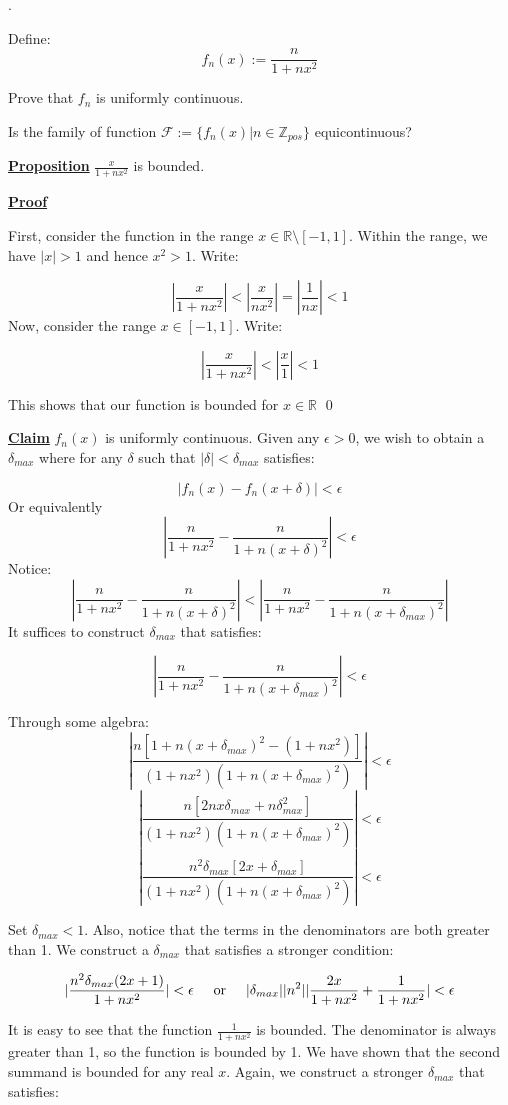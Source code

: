 \documentclass{article}
\newcommand{\new}[1]{
    \vspace{2mm}
    \noindent
    \textbf{
    \underline{#1}}
}
\def\ZZ{{\mathbb{Z}}}
\def\RR{{\mathbb{R}}}
\newcounter{problemcnt}
\newcommand{\Problem}{{
    \vspace{5mm}
    \stepcounter{problemcnt}
    \noindent
    \arabic{problemcnt}. 
}
}
\newcommand{\Proof}{{
    \vspace{2mm}
    \noindent
    \textbf{
    \underline{Proof}}
}
}
\newcommand{\textOr}{
    {
        \hspace{5mm}
        \textrm{or}
        \hspace{5mm}
    }
}
\begin{document}
\Problem
Define:
\[
    f_n(x) := 
    \frac{n}{1+nx^2}
\]

Prove that $f_n$ is uniformly continuous. 

Is the family of function
$\mathcal{F}:=\{f_n(x)|n\in \ZZ_{pos}\}$ equicontinuous?

\new{Proposition} $\frac{x}{1+nx^2}$ is bounded. 

\Proof
First, consider the function in the range 
$x \in \RR \setminus [-1, 1]$. Within the range, 
we have $|x| > 1$ and hence $x^2 > 1$. Write:

\[
    |\frac{x}{1+nx^2}| < |\frac{x}{nx^2}| = |\frac{1}{nx}| < 1
\]
Now, consider the range $x \in [-1, 1]$. Write:

\[
    |\frac{x}{1+nx^2}| < |\frac{x}{1}| < 1
\]

This shows that our function is bounded for $x\in \RR$
\qed

\new{Claim} $f_n(x)$ is uniformly continuous. 
Given any $\epsilon > 0$, we wish to obtain a $\delta_{max}$ where
for any $\delta$ such that $|\delta| < \delta_{max}$ satisfies:

\[
    |f_n(x)-f_n(x+\delta)| < \epsilon
\]
Or equivalently
\[
  |\frac{n}{1+nx^2} -\frac{n}{1+n(x+\delta)^2}| <\epsilon 
\]
Notice:
\[
  |\frac{n}{1+nx^2} -\frac{n}{1+n(x+\delta)^2}| <
|\frac{n}{1+nx^2} -\frac{n}{1+n(x+\delta_{max})^2}| 
\]
It suffices to construct $\delta_{max}$ that satisfies:

\[
    |\frac{n}{1+nx^2} -\frac{n}{1+n(x+\delta_{max})^2}| 
    < \epsilon
\]

Through some algebra:
\[
    |\frac{
    n 
    \left[
    1+n(x+\delta_{max})^2 - (1+nx^2) 
    \right]
    }
    {(1+nx^2)(1+n(x+\delta_{max})^2)}|
     < \epsilon
\]
\[
    |\frac{
    n 
    \left[
    2nx\delta_{max} + n\delta_{max}^2
    \right]
    }
    {(1+nx^2)(1+n(x+\delta_{max})^2)}|
     < \epsilon
\]
\[
    |\frac{
    n^2\delta_{max}
    \left[
    2x + \delta_{max}
    \right]
    }
    {(1+nx^2)(1+n(x+\delta_{max})^2)}|
     < \epsilon
\]

Set $\delta_{max} < 1$. Also, notice that the 
terms in the denominators are both greater than 1. 
We construct a $\delta_{max}$ that satisfies a stronger 
condition:

\[
    |\frac{
        n^2\delta_{max}(2x+1)
    }
    {1+nx^2}|
    <\epsilon
    \textOr
    |\delta_{max}||n^2||
    \frac{2x}{1+nx^2}+
    \frac{1}{1+nx^2}|
    < \epsilon
\]

It is easy to see that the function $\frac{1}{1+nx^2}$
is bounded. The denominator is always greater than 1, 
so the function is bounded by 1. We have shown that the second
summand is bounded for any real $x$. Again, we construct 
a stronger $\delta_{max}$ that satisfies:
\end{document}

